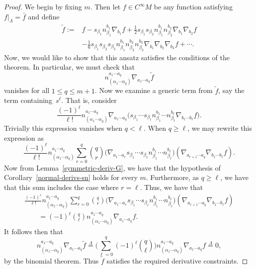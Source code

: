 \documentclass[pdftex]{sigma}
\numberwithin{equation}{section}
\renewcommand{\=}{\stackrel \Lambda =}
\begin{document}
\begin{proof}
We begin by fixing $m$. Then let $f \in C^\infty M$ be any function satisfying $f|_{\Lambda} = \bar{f}$ and define
\begin{align}
\tilde{f} :={}& f - s_{\beta_1} n^{b_1}_{\beta_1} \nabla_{b_1} f + \frac{1}{2} s_{\beta_1} s_{\beta_2} n^{b_1}_{\beta_1} n^{b_2}_{\beta_2} \nabla_{b_1} \nabla_{b_2} f\nonumber \\
&- \frac{1}{6} s_{\beta_1} s_{\beta_2} s_{\beta_3} n^{b_1}_{\beta_1} n^{b_2}_{\beta_2} n^{b_3}_{\beta_3} \nabla_{b_1} \nabla_{b_2} \nabla_{b_3} f + \cdots .\label{sym-ext}
\end{align}
Now, we would like to show that this ansatz satisfies the conditions of the theorem. In particular, we must check that
\[n^{a_1 \cdots a_q}_{(\alpha_1 \cdots \alpha_q)} \nabla_{a_1 \cdots a_q} \tilde{f} \]
vanishes for all $1 \leq q \leq m+1$. Now we examine a generic term from $\tilde{f}$, say the term containing~$s^{\ell}$. That is, consider
\[\frac{(-1)^{\ell}}{\ell!} n^{a_1 \cdots a_q}_{(\alpha_1 \cdots \alpha_q)} \nabla_{a_1 \cdots a_q} \bigl(s_{\beta_1} \cdots s_{\beta_{\ell}} n^{b_1}_{\beta_1} \cdots n^{b_\ell}_{\beta_{\ell}} \nabla_{b_1 \cdots b_{\ell}} f\bigr) .\]
Trivially this expression vanishes when $q < \ell$. When $q \geq \ell$, we may rewrite this expression as
\[\frac{(-1)^{\ell}}{\ell!} n^{a_1 \cdots a_q}_{(\alpha_1 \cdots \alpha_q)} \sum_{r=0}^{q} {q \choose r} \bigl(\nabla_{a_1 \cdots a_r} s_{\beta_1} \cdots s_{\beta_{\ell}} n^{b_1}_{\beta_1} \cdots n^{b_\ell}_{\beta_{\ell}}\bigr)(\nabla_{a_{r+1} \cdots a_{q}} \nabla_{b_1 \cdots b_{\ell}} f) .\]
Now from Lemma~\ref{symmetric-deriv-G}, we have that the hypothesis of Corollary~\ref{normal-derivs-sn} holds for every $m$. Furthermore, as $q \geq \ell$, we have that this sum includes the case where $r = \ell$. Thus, we have that
\begin{gather*}
\frac{(-1)^{\ell}}{\ell!} n^{a_1 \cdots a_q}_{(\alpha_1 \cdots \alpha_q)} \sum_{r=0}^{q} {q \choose r} \bigl(\nabla_{a_1 \cdots a_r} s_{\beta_1} \cdots s_{\beta_{\ell}} n^{b_1}_{\beta_1} \cdots n^{b_\ell}_{\beta_{\ell}}\bigr)(\nabla_{a_{r+1} \cdots a_{q}} \nabla_{b_1 \cdots b_{\ell}} f) \\
\qquad{}= (-1)^{\ell} {q \choose \ell} n^{a_1 \cdots a_q}_{(\alpha_1 \cdots \alpha_q)} \nabla_{a_1 \cdots a_q} f .
\end{gather*}
It follows then that
\[n^{a_1 \cdots a_q}_{(\alpha_1 \cdots \alpha_q)} \nabla_{a_1 \cdots a_q} \tilde{f} \= \Biggl(\sum_{\ell = 0}^q (-1)^{\ell} {q \choose \ell} \Biggr) n^{a_1 \cdots a_q}_{(\alpha_1 \cdots \alpha_q)} \nabla_{a_1 \cdots a_q} f \= 0 ,\]
by the binomial theorem. Thus $\tilde{f}$ satisfies the required derivative constraints.




\end{proof}
\end{document}
